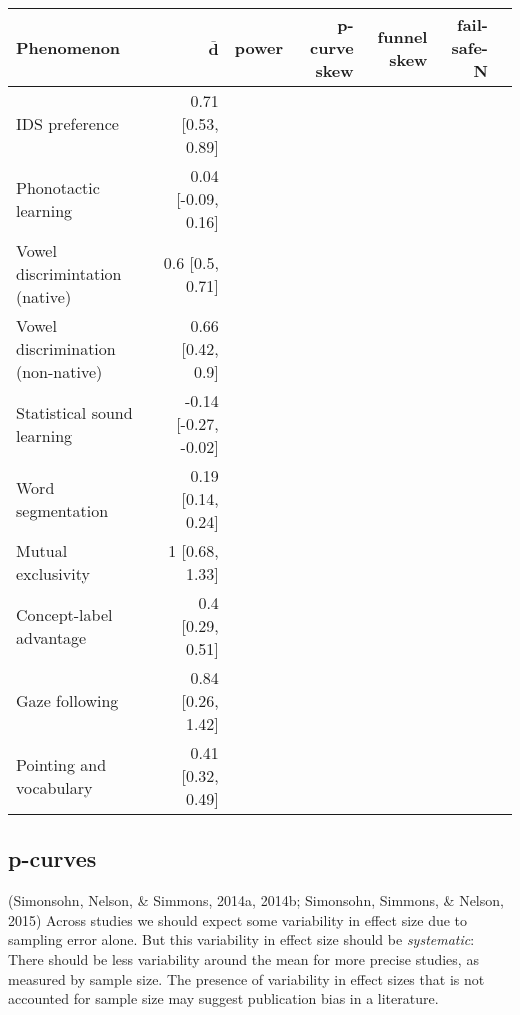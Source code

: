 \documentclass[american,floatsintext,man]{apa6}
\begin{document}
\begin{table}[h!]
    \footnotesize
    \begin{tabular}{lrrrrrr}
        \textbf{Phenomenon}                                 & $\mathbf{\bar{d}}$ & \textbf{power} & \textbf{p-curve skew} & \textbf{funnel skew} & \textbf{fail-safe-N} \\                   
        \hline
        IDS  preference                  & 0.71 [0.53, 0.89]         & ~         & ~     & ~            & ~   \\ 
        Phonotactic learning              & 0.04 [-0.09, 0.16]          & ~         & ~     & ~            & ~         \\ 
        Vowel discrimintation (native)    & 0.6 [0.5, 0.71]           & ~         & ~     & ~            & ~             \\ 
        Vowel discrimination (non-native) & 0.66 [0.42, 0.9]           & ~         & ~     & ~            & ~           \\ 
        Statistical sound learning        & -0.14 [-0.27, -0.02]           & ~         & ~     & ~            & ~             \\ 
        Word segmentation                 & 0.19 [0.14, 0.24]           & ~         & ~     & ~            & ~             \\ 
        Mutual exclusivity               & 1 [0.68, 1.33]           & ~         & ~     & ~            & ~             \\ 
        Concept-label advantage           & 0.4 [0.29, 0.51]           & ~         & ~     & ~            & ~              \\ 
        Gaze following                    & 0.84 [0.26, 1.42]          & ~         & ~     & ~            & ~             \\ 
        Pointing and vocabulary           & 0.41 [0.32, 0.49]           & ~         & ~     & ~            & ~               \\ 
    \end{tabular}
\end{table}

\subsection{p-curves}\label{p-curves}

(Simonsohn, Nelson, \& Simmons, 2014a, 2014b; Simonsohn, Simmons, \&
Nelson, 2015) Across studies we should expect some variability in effect
size due to sampling error alone. But this variability in effect size
should be \emph{systematic}: There should be less variability around the
mean for more precise studies, as measured by sample size. The presence
of variability in effect sizes that is not accounted for sample size may
suggest publication bias in a literature.
\end{document}
